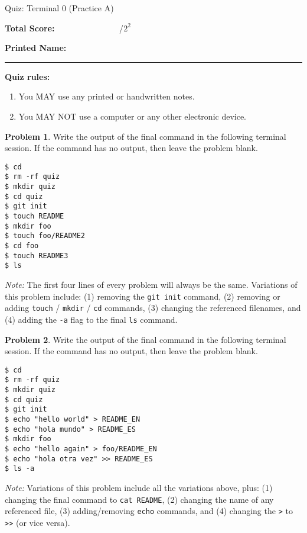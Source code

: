 \documentclass[10pt]{article}
\theoremstyle{definition}
\newtheorem{problem}{Problem}
\begin{document}
\begin{center}
    {
\Large
    Quiz: Terminal 0 (Practice A)
}


    \vspace{0.1in}
\end{center}

\vspace{0.15in}
\noindent
\textbf{Total Score:} ~~~~~~~~~~~~~~~/$2^2$

\vspace{0.2in}
\noindent
\textbf{Printed Name:}

\noindent
\rule{\textwidth}{0.1pt}
\vspace{0.15in}

\noindent
\textbf{Quiz rules:}
\begin{enumerate}
    \item You MAY use any printed or handwritten notes.
    \item You MAY NOT use a computer or any other electronic device.
\end{enumerate}

\noindent

\vspace{0.15in}


\begin{problem}
    Write the output of the final command in the following terminal session.
    If the command has no output, then leave the problem blank.
\end{problem}
\begin{lstlisting}
$ cd
$ rm -rf quiz
$ mkdir quiz
$ cd quiz
$ git init
$ touch README
$ mkdir foo
$ touch foo/README2
$ cd foo
$ touch README3
$ ls
\end{lstlisting}
\textit{Note:}
The first four lines of every problem will always be the same.
Variations of this problem include:
(1) removing the \lstinline{git init} command,
(2) removing or adding \lstinline{touch} / \lstinline{mkdir} / \lstinline{cd} commands,
(3) changing the referenced filenames,
and (4) adding the \lstinline{-a} flag to the final \lstinline{ls} command.
\vspace{0.3in}


\begin{problem}
    Write the output of the final command in the following terminal session.
    If the command has no output, then leave the problem blank.
\end{problem}
\begin{lstlisting}
$ cd
$ rm -rf quiz
$ mkdir quiz
$ cd quiz
$ git init
$ echo "hello world" > README_EN
$ echo "hola mundo" > README_ES
$ mkdir foo
$ echo "hello again" > foo/README_EN
$ echo "hola otra vez" >> README_ES
$ ls -a
\end{lstlisting}
\textit{Note:}
Variations of this problem include all the variations above,
plus:
(1) changing the final command to \lstinline{cat README},
(2) changing the name of any referenced file,
(3) adding/removing \lstinline{echo} commands,
and (4) changing the \lstinline{>} to \lstinline{>>} (or vice versa).
\end{document}
